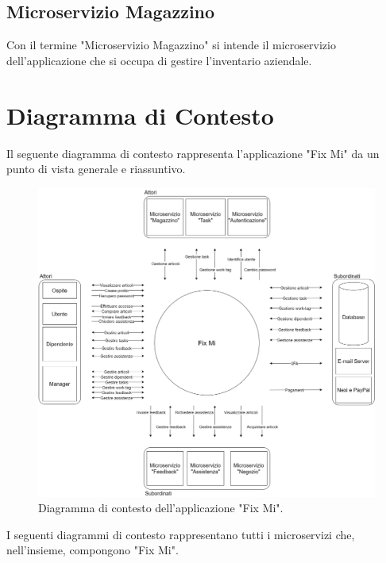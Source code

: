 \documentclass{report}
\begin{document}
\subsection*{Microservizio Magazzino}
Con il termine "Microservizio Magazzino" si intende il microservizio dell'applicazione che si occupa di gestire l'inventario aziendale.


\section{Diagramma di Contesto}

Il seguente diagramma di contesto rappresenta l'applicazione "Fix Mi" da un punto di vista generale e riassuntivo.

\begin{figure}[H]
	\centering\includegraphics[width=1\textwidth]{images/Diagrammi_Contesto/Diagramma_Contesto_FixMi.png}
	Diagramma di contesto dell'applicazione "Fix Mi".
\end{figure}

I seguenti diagrammi di contesto rappresentano tutti i microservizi che, nell'insieme, compongono "Fix Mi".
\end{document}
